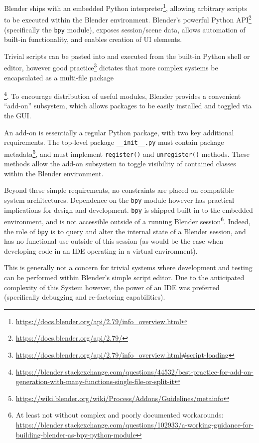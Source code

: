 Blender ships with an embedded Python interpreter\footnote{\url{https://docs.blender.org/api/2.79/info_overview.html}}, allowing arbitrary scripts to be executed within the Blender environment.
Blender's powerful Python API\footnote{\url{https://docs.blender.org/api/2.79/}} (specifically the \texttt{bpy} module), exposes session/scene data, allows automation of built-in functionality, and enables creation of UI elements.

Trivial scripts can be pasted into and executed from the built-in Python shell or editor, however good practice\footnote{\url{https://docs.blender.org/api/2.79/info_overview.html#script-loading}} dictates that more complex systems be encapsulated as a multi-file package{\footnote{\url{https://blender.stackexchange.com/questions/44532/best-practice-for-add-on-generation-with-many-functions-single-file-or-split-it}}.
To encourage distribution of useful modules, Blender provides a convenient ``add-on'' subsystem, which allows packages to be easily installed and toggled via the GUI.

An add-on is essentially a regular Python package, with two key additional requirements. 
The top-level package \texttt{\_\_init\_\_.py} must contain package metadata\footnote{\url{https://wiki.blender.org/wiki/Process/Addons/Guidelines/metainfo}}, and must implement \texttt{register()} and \texttt{unregister()} methods.
These methods allow the add-on subsystem to toggle visibility of contained classes within the Blender environment.

Beyond these simple requirements, no constraints are placed on compatible system architectures. 
Dependence on the \texttt{bpy} module however has practical implications for design and development.
\texttt{bpy} is shipped built-in to the embedded environment, and is not accessible outside of a running Blender session\footnote{At least not without complex and poorly documented workarounds: \url{https://blender.stackexchange.com/questions/102933/a-working-guidance-for-building-blender-as-bpy-python-module}}.
Indeed, the role of \texttt{bpy} is to query and alter the internal state of a Blender session, and has no functional use outside of this session (as would be the case when developing code in an IDE operating in a virtual environment).

This is generally not a concern for trivial systems where development and testing can be performed within Blender's simple script editor.
Due to the anticipated complexity of this System however, the power of an IDE was preferred (specifically debugging and re-factoring capabilities).

}
